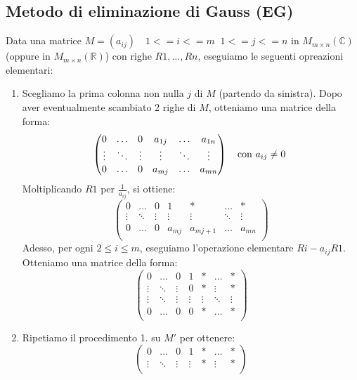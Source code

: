 \documentclass[a4paper]{article}
\theoremstyle{break}
\theoremstyle{break}
\theoremstyle{break}
\theoremstyle{break}
\begin{document}
\subsection{Metodo di eliminazione di Gauss (EG)}
Data una matrice \( M = (a_{ij}) \quad 1<=i<=m \;\; 1<=j<=n \) in \( M_{m \times n}(\mathbb{C}) \) 
(oppure in \( M_{m \times n}(\mathbb{R}) \)) con righe \( R1, \ldots, Rn \), eseguiamo le
seguenti opreazioni elementari:
\begin{enumerate}
  \item Scegliamo la prima colonna non nulla \( j \) di \( M \) (partendo da sinistra).
    Dopo aver eventualmente scambiato 2 righe di \( M \), otteniamo una matrice
    della forma: 
    \[
    \begin{pmatrix} 
      0 & \ldots & 0 & a_{1j} & \ldots & a_{1n} \\
      \vdots & \ddots & \vdots & \vdots & \ddots & \vdots \\
      0 & \ldots & 0 & a_{mj} & \ldots & a_{mn} \\
    \end{pmatrix} \quad \text{con \( a_{ij} \neq 0 \) }
    \] 
    Moltiplicando \( R1 \) per \( \frac{1}{a_{ij}} \), si ottiene:
    \[
    \begin{pmatrix} 
      0 & \ldots & 0 & 1 & * & \ldots & * \\
      \vdots & \ddots & \vdots & \vdots & \vdots & \ddots & \vdots \\
      0 & \ldots & 0 & a_{mj} & a_{mj+1} & \ldots & a_{mn} \\
    \end{pmatrix}
    \] 
    Adesso, per ogni \( 2 \le i \le m \), eseguiamo l'operazione elementare \( Ri - a_{ij}R1 \).
    Otteniamo una matrice della forma:
 \label{D1}
    \[
    \begin{pmatrix} 
      0 & \ldots & 0 & 1 & * & \ldots & * \\
      \vdots & \ddots & \vdots & 0 & * & \vdots & * \\
      \vdots & \ddots & \vdots & \vdots & \vdots & \ddots & \vdots \\
      0 & \ldots & 0 & 0 & * & \ldots & * \\
    \end{pmatrix}
    \]
  \item Ripetiamo il procedimento 1. su \( M' \) per ottenere:
    \label{D2}
    \[
    \begin{pmatrix} 
      0 & \ldots & 0 & 1 & * & \ldots & * \\
      \vdots & \ddots & \vdots & \vdots & * & \vdots & * \\

\end{pmatrix}\]
\end{enumerate}
\end{document}
